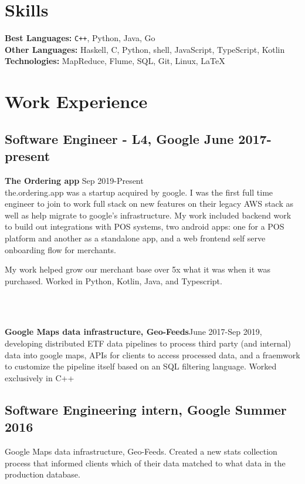 \documentclass[5pt]{resume}
\begin{document}


{\color{titleColor}\section{Skills}}
\noindent\textbf{Best Languages:} {\color{default} \verb!C++!, Python, Java, Go }\\
\textbf{Other Languages:} {\color{default} Haskell, C, Python, shell, JavaScript, TypeScript, Kotlin} \\
\textbf{Technologies:} {\color{default} MapReduce, Flume, SQL, Git, Linux, \LaTeX } 

{\color{titleColor} \section{Work Experience}}

\subsection{\textbf{Software Engineer - L4, Google \hfill June 2017-present}}
{\textbf{The Ordering app} \hfill Sep 2019-Present
\\
\color{default} 
  \noindent the.ordering.app was a startup acquired by google. I
  was the first full time engineer to join to work full stack on new
  features on their legacy AWS stack as well as help migrate to google's
  infrastructure.  My work included backend work to build out integrations
  with POS systems, two android apps: one for a POS platform and another
  as a standalone app, and a web frontend self serve onboarding flow
  for merchants.

  \noindent My work helped grow our merchant base over 5x what it was when it was purchased.
  \noindent Worked in Python, Kotlin, Java, and Typescript.
}
\\
\\
{\textbf{Google Maps data infrastructure, Geo-Feeds}\hfill June 2017-Sep 2019,
\\
  \color{default} 
  \noindent developing distributed ETF data pipelines to process third
  party (and internal) data into google maps, APIs for clients to access
  processed data, and a fraemwork to customize the pipeline itself based
  on an SQL filtering language. Worked exclusively in C++

  }

\subsection{\textbf{Software Engineering intern, Google \hfill Summer 2016}}
{\color{default} Google Maps data infrastructure, Geo-Feeds. Created a
  new stats collection process that informed clients which of their
  data matched to what data in the production database.}
\end{document}
